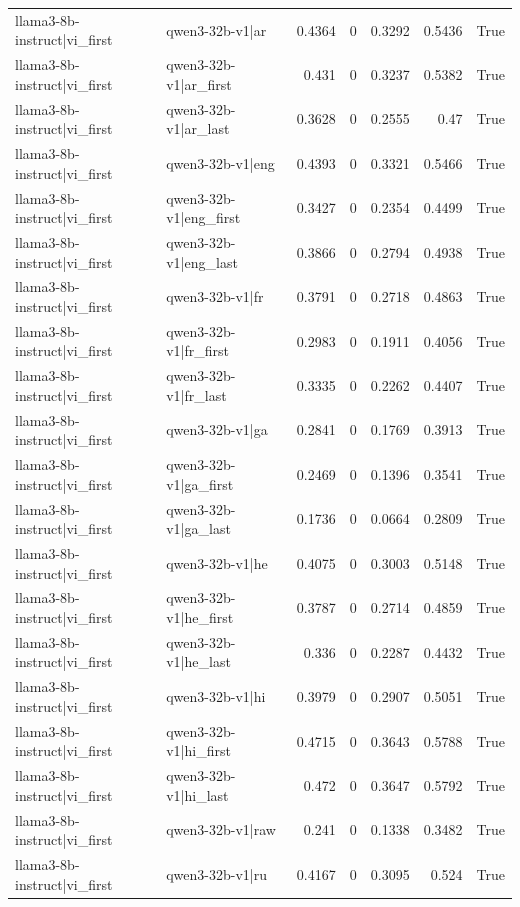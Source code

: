 \begin{table}
\begin{tabular}{l l r r r r l}
llama3-8b-instruct|vi_first & qwen3-32b-v1|ar & 0.4364 & 0 & 0.3292 & 0.5436 & True \\
llama3-8b-instruct|vi_first & qwen3-32b-v1|ar_first & 0.431 & 0 & 0.3237 & 0.5382 & True \\
llama3-8b-instruct|vi_first & qwen3-32b-v1|ar_last & 0.3628 & 0 & 0.2555 & 0.47 & True \\
llama3-8b-instruct|vi_first & qwen3-32b-v1|eng & 0.4393 & 0 & 0.3321 & 0.5466 & True \\
llama3-8b-instruct|vi_first & qwen3-32b-v1|eng_first & 0.3427 & 0 & 0.2354 & 0.4499 & True \\
llama3-8b-instruct|vi_first & qwen3-32b-v1|eng_last & 0.3866 & 0 & 0.2794 & 0.4938 & True \\
llama3-8b-instruct|vi_first & qwen3-32b-v1|fr & 0.3791 & 0 & 0.2718 & 0.4863 & True \\
llama3-8b-instruct|vi_first & qwen3-32b-v1|fr_first & 0.2983 & 0 & 0.1911 & 0.4056 & True \\
llama3-8b-instruct|vi_first & qwen3-32b-v1|fr_last & 0.3335 & 0 & 0.2262 & 0.4407 & True \\
llama3-8b-instruct|vi_first & qwen3-32b-v1|ga & 0.2841 & 0 & 0.1769 & 0.3913 & True \\
llama3-8b-instruct|vi_first & qwen3-32b-v1|ga_first & 0.2469 & 0 & 0.1396 & 0.3541 & True \\
llama3-8b-instruct|vi_first & qwen3-32b-v1|ga_last & 0.1736 & 0 & 0.0664 & 0.2809 & True \\
llama3-8b-instruct|vi_first & qwen3-32b-v1|he & 0.4075 & 0 & 0.3003 & 0.5148 & True \\
llama3-8b-instruct|vi_first & qwen3-32b-v1|he_first & 0.3787 & 0 & 0.2714 & 0.4859 & True \\
llama3-8b-instruct|vi_first & qwen3-32b-v1|he_last & 0.336 & 0 & 0.2287 & 0.4432 & True \\
llama3-8b-instruct|vi_first & qwen3-32b-v1|hi & 0.3979 & 0 & 0.2907 & 0.5051 & True \\
llama3-8b-instruct|vi_first & qwen3-32b-v1|hi_first & 0.4715 & 0 & 0.3643 & 0.5788 & True \\
llama3-8b-instruct|vi_first & qwen3-32b-v1|hi_last & 0.472 & 0 & 0.3647 & 0.5792 & True \\
llama3-8b-instruct|vi_first & qwen3-32b-v1|raw & 0.241 & 0 & 0.1338 & 0.3482 & True \\
llama3-8b-instruct|vi_first & qwen3-32b-v1|ru & 0.4167 & 0 & 0.3095 & 0.524 & True \\

\end{tabular}
\end{table}
